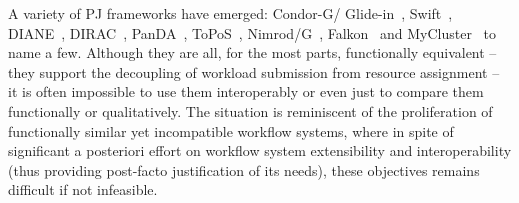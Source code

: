 \documentclass{sig-alternate}
\begin{document}
A variety of PJ frameworks have emerged:
Condor-G/ Glide-in~\cite{condor-g}, Swift~\cite{Wilde2011},
DIANE~\cite{Moscicki:908910}, DIRAC~\cite{1742-6596-219-6-062049},
PanDA~\cite{1742-6596-219-6-062041}, ToPoS~\cite{topos},
Nimrod/G~\cite{10.1109/HPC.2000.846563}, Falkon~\cite{1362680} and
MyCluster~\cite{1652061} to name a few. Although they are all, for the
most parts, functionally equivalent -- they support the decoupling of
workload submission from resource assignment -- it is often impossible
to use them interoperably or even just to compare them functionally or
qualitatively.  The situation is reminiscent of the proliferation of
functionally similar yet incompatible workflow systems, where in spite
of significant a posteriori effort on workflow system extensibility
and interoperability (thus providing post-facto justification of its
needs), these objectives remains difficult if not infeasible.









\end{document}
